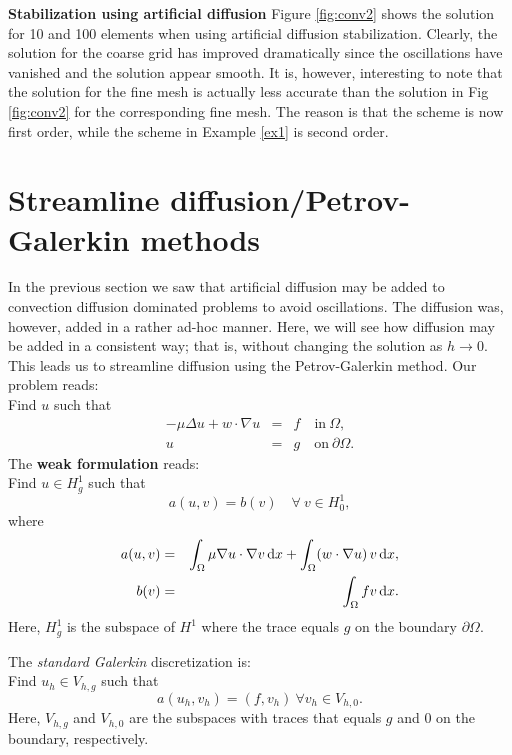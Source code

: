 \begin{example}{\textbf{Stabilization using artificial diffusion}}
Figure \ref{fig:conv2} shows the solution for 10 and 100 elements when using artificial diffusion 
stabilization.  Clearly, the solution for the coarse grid has improved dramatically since the
oscillations have vanished and the solution appear smooth. It is, however, interesting to note
that the solution for the fine mesh is actually less accurate than the solution in Fig \ref{fig:conv2} 
for the corresponding fine mesh. The reason is that the scheme is now first order, while the 
scheme in Example \ref{ex1} is second order.    
\end{example}



\section{Streamline diffusion/Petrov-Galerkin methods}
In the previous section we saw that artificial diffusion may be added to convection diffusion dominated problems to avoid 
oscillations. The diffusion was, however, added in a rather ad-hoc manner.  
Here, we will see how diffusion may be added in a consistent way; 
that is, without changing the solution as $h\rightarrow 0$. 
This leads us to streamline diffusion using the Petrov-Galerkin method.
Our problem reads: \\ 
Find $u$ such that 
\begin{eqnarray*}
-\mu\Delta u + w\cdot\nabla u &=& f \quad \textrm{in}\ \Omega, \\
u&=& g \quad \textrm{on}\ \partial\Omega .
\end{eqnarray*}
The \textbf{weak formulation} reads: \\
Find $u\in H_g^1$ such that 
\[
a(u,v) = b(v) \quad \forall\ v\in H_0^1, 
\]
where
\begin{eqnarray*}
	a(u,v) &=& \int_\Omega\mu\nabla u \cdot \nabla v \, \mathrm{d}x + \int_\Omega (w \cdot \nabla u) \, v \, \mathrm{d}x,   \\
b(v) &=& \int_\Omega f v \, \mathrm{d}x . 
\end{eqnarray*}
Here, $H_g^1$ is the subspace of $H^1$ where the trace equals $g$ on the boundary $\partial \Omega$.  

The \textit{standard Galerkin} discretization is: \\
Find $u_h\in V_{h,g}$ such that 
\begin{equation}
\label{Galerkin}
a(u_h, v_h) = (f,v_h)\ \forall v_h\in V_{h,0}.
\end{equation}
Here, $V_{h,g}$  and $V_{h,0}$ are the subspaces with traces that equals $g$ and $0$ on 
the boundary, respectively.  

